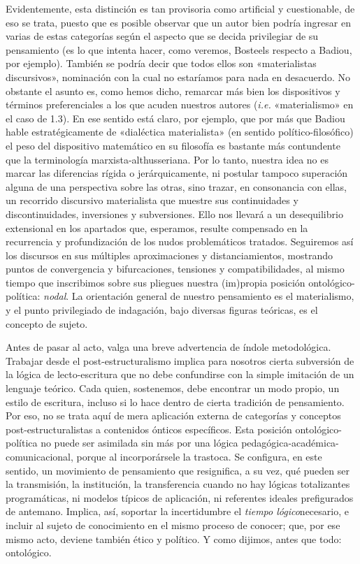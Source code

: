 Evidentemente, esta distinción es tan provisoria como artificial y cuestionable, de eso se trata, puesto que es posible observar que un autor bien podría ingresar en varias de estas categorías según el aspecto que se decida privilegiar de su pensamiento (es lo que intenta hacer, como veremos, Bosteels respecto a Badiou, por ejemplo). También se podría decir que todos ellos son «materialistas discursivos», nominación con la cual no estaríamos para nada en desacuerdo. No obstante el asunto es, como hemos dicho, remarcar más bien los dispositivos y términos preferenciales a los que acuden nuestros autores (\emph{i.e.} «materialismo» en el caso de 1.3). En ese sentido está claro, por ejemplo, que por más que Badiou hable estratégicamente de «dialéctica materialista» (en sentido político-filosófico) el peso del dispositivo matemático en su filosofía es bastante más contundente que la terminología marxista-althusseriana. Por lo tanto, nuestra idea no es marcar las diferencias rígida o jerárquicamente, ni postular tampoco superación alguna de una perspectiva sobre las otras, sino trazar, en consonancia con ellas, un recorrido discursivo materialista que muestre sus continuidades y discontinuidades, inversiones y subversiones. Ello nos llevará a un desequilibrio extensional en los apartados que, esperamos, resulte compensado en la recurrencia y profundización de los nudos problemáticos tratados. Seguiremos así los discursos en sus múltiples aproximaciones y distanciamientos, mostrando puntos de convergencia y bifurcaciones, tensiones y compatibilidades, al mismo tiempo que inscribimos sobre sus pliegues nuestra (im)propia posición ontológico-política: \emph{nodal}. La orientación general de nuestro pensamiento es el materialismo, y el punto privilegiado de indagación, bajo diversas figuras teóricas, es el concepto de sujeto.

Antes de pasar al acto, valga una breve advertencia de índole metodológica. Trabajar desde el post-estructuralismo implica para nosotros cierta subversión de la lógica de lecto-escritura que no debe confundirse con la simple imitación de un lenguaje teórico. Cada quien, sostenemos, debe encontrar un modo propio, un estilo de escritura, incluso si lo hace dentro de cierta tradición de pensamiento. Por eso, no se trata aquí de mera aplicación externa de categorías y conceptos post-estructuralistas a contenidos ónticos específicos. Esta posición ontológico-política no puede ser asimilada sin más por una lógica pedagógica-académica-comunicacional, porque al incorporársele la trastoca. Se configura, en este sentido, un movimiento de pensamiento que resignifica, a su vez, qué pueden ser la transmisión, la institución, la transferencia cuando no hay lógicas totalizantes programáticas, ni modelos típicos de aplicación, ni referentes ideales prefigurados de antemano. Implica, así, soportar la incertidumbre el \emph{tiempo lógico}necesario, e incluir al sujeto de conocimiento en el mismo proceso de conocer; que, por ese mismo acto, deviene también ético y político. Y como dijimos, antes que todo: ontológico.

